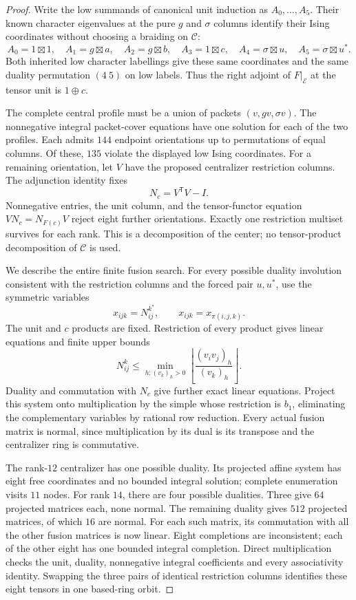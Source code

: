 \begin{proof}
Write the low summands of canonical unit induction as $A_0,\ldots,A_5$.
Their known character eigenvalues at the pure $g$ and $\sigma$ columns
identify their Ising coordinates without choosing a braiding on
$\mathcal C$:
\[
 A_0=1\boxtimes1,\quad A_1=g\boxtimes a,\quad
 A_2=g\boxtimes b,\quad A_3=1\boxtimes c,\quad
 A_4=\sigma\boxtimes u,\quad A_5=\sigma\boxtimes u^*.
\]
Both inherited low character labellings give these same coordinates
and the same duality permutation $(4\ 5)$ on low labels. Thus the right
adjoint of $F|_{\mathcal E}$ at the tensor unit is $1\oplus c$.

The complete central profile must be a union of packets
$(v,gv,\sigma v)$. The nonnegative integral packet-cover equations
have one solution for each of the two profiles. Each admits $144$
endpoint orientations up to permutations of equal columns. Of these,
$135$ violate the displayed low Ising coordinates. For a remaining
orientation, let $V$ have the proposed centralizer restriction columns.
The adjunction identity fixes
\[
 N_c=V^{\mathsf T}V-I.
\]
Nonnegative entries, the unit column, and the tensor-functor equation
$VN_c=N_{F(c)}V$ reject eight further orientations. Exactly one
restriction multiset survives for each rank. This is a decomposition
of the center; no tensor-product decomposition of $\mathcal C$ is used.

We describe the entire finite fusion search. For every possible duality
involution consistent with the restriction columns and the forced pair
$u,u^*$, use the symmetric variables
\[
 x_{ijk}=N_{ij}^{k^*},\qquad x_{ijk}=x_{\pi(i,j,k)}.
\]
The unit and $c$ products are fixed. Restriction of every product gives
linear equations and finite upper bounds
\[
 N_{ij}^{k}\le
 \min_{h:(v_k)_h>0}
 \left\lfloor\frac{(v_iv_j)_h}{(v_k)_h}\right\rfloor.
\]
Duality and commutation with $N_c$ give further exact linear equations.
Project this system onto multiplication by the simple whose restriction
is $b_1$, eliminating the complementary variables by rational row
reduction. Every actual fusion matrix is normal, since multiplication
by its dual is its transpose and the centralizer ring is commutative.

The rank-$12$ centralizer has one possible duality. Its projected affine
system has eight free coordinates and no bounded integral solution;
complete enumeration visits $11$ nodes. For rank $14$, there are four
possible dualities. Three give $64$ projected matrices each, none normal.
The remaining duality gives $512$ projected matrices, of which $16$ are
normal. For each such matrix, its commutation with all the other fusion
matrices is now linear. Eight completions are inconsistent; each of the
other eight has one bounded integral completion. Direct multiplication
checks the unit, duality, nonnegative integral coefficients and every
associativity identity. Swapping the three pairs of identical restriction
columns identifies these eight tensors in one based-ring orbit.


\end{proof}

